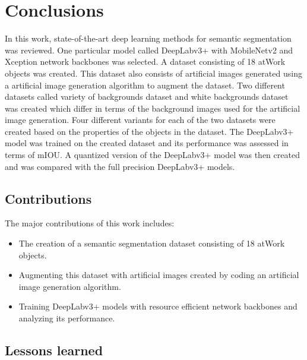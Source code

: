 
\chapter{Conclusions}

In this work, state-of-the-art deep learning methods for semantic segmentation was reviewed. One particular model called DeepLabv3+ with MobileNetv2 and Xception network backbones was selected. A dataset consisting of 18 atWork objects was created. This dataset also consists of artificial images generated using a artificial image generation algorithm to augment the dataset. Two different datasets called variety of backgrounds dataset and white backgrounds dataset was created which differ in terms of the background images used for the artificial image generation. Four different variants for each of the two datasets were created based on the properties of the objects in the dataset. The DeepLabv3+ model was trained on the created dataset and its performance was assessed in terms of mIOU. A quantized version of the DeepLabv3+ model was then created and was compared with the full precision DeepLabv3+ models.

\section{Contributions}

The major contributions of this work includes:
	\begin{itemize}
		\item The creation of a semantic segmentation dataset consisting of 18 atWork objects.
		\item Augmenting this dataset with artificial images created by coding an artificial image generation algorithm.
		\item Training DeepLabv3+ models with resource efficient network backbones and analyzing its performance.
	\end{itemize}

\section{Lessons learned}

